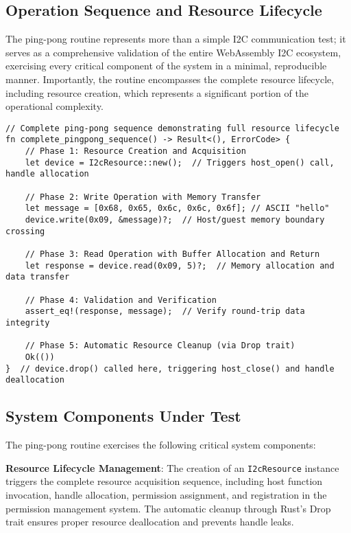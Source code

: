 \subsection{Operation Sequence and Resource Lifecycle}

The ping-pong routine represents more than a simple I2C communication test; it serves as a comprehensive validation of the entire WebAssembly I2C ecosystem, exercising every critical component of the system in a minimal, reproducible manner. Importantly, the routine encompasses the complete resource lifecycle, including resource creation, which represents a significant portion of the operational complexity.

\begin{verbatim}
// Complete ping-pong sequence demonstrating full resource lifecycle
fn complete_pingpong_sequence() -> Result<(), ErrorCode> {
    // Phase 1: Resource Creation and Acquisition
    let device = I2cResource::new();  // Triggers host_open() call, handle allocation
    
    // Phase 2: Write Operation with Memory Transfer
    let message = [0x68, 0x65, 0x6c, 0x6c, 0x6f]; // ASCII "hello"
    device.write(0x09, &message)?;  // Host/guest memory boundary crossing
    
    // Phase 3: Read Operation with Buffer Allocation and Return
    let response = device.read(0x09, 5)?;  // Memory allocation and data transfer
    
    // Phase 4: Validation and Verification
    assert_eq!(response, message);  // Verify round-trip data integrity
    
    // Phase 5: Automatic Resource Cleanup (via Drop trait)
    Ok(())
}  // device.drop() called here, triggering host_close() and handle deallocation
\end{verbatim}

\subsection{System Components Under Test}

The ping-pong routine exercises the following critical system components:

\textbf{Resource Lifecycle Management}: The creation of an \texttt{I2cResource} instance triggers the complete resource acquisition sequence, including host function invocation, handle allocation, permission assignment, and registration in the permission management system. The automatic cleanup through Rust's Drop trait ensures proper resource deallocation and prevents handle leaks.

